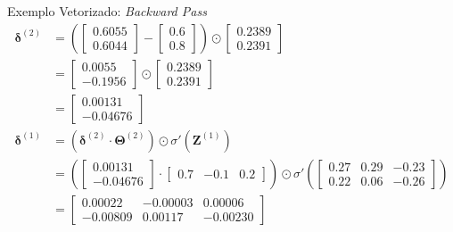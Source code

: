 \documentclass[aspectratio=169, xcolor=dvipsnames]{beamer}
\begin{document}
\begin{frame}{Exemplo Vetorizado: \textit{Backward Pass}}
        \small
        \begin{align*}
      \bm{\delta}^{(2)} &= \left(
      \begin{bmatrix}
        0.6055 \\
        0.6044
      \end{bmatrix}
      -
      \begin{bmatrix}
        0.6 \\
        0.8
      \end{bmatrix}
      \right) \odot
      \begin{bmatrix}
        0.2389 \\
        0.2391
      \end{bmatrix}\\
      &=
      \begin{bmatrix}
        0.0055  \\
        -0.1956
      \end{bmatrix}
      \odot
      \begin{bmatrix}
        0.2389 \\
        0.2391
      \end{bmatrix}\\
      &=
      \begin{bmatrix}
        0.00131 \\
        -0.04676
      \end{bmatrix}\\
      \bm{\delta}^{(1)} &= (\bm{\delta}^{(2)}\cdot \mathbf{\Theta}^{(2)}) \odot \sigma'(\mathbf{Z}^{(1)})\\
      &= \left(
      \begin{bmatrix}
        0.00131 \\
        -0.04676
      \end{bmatrix}
      \cdot
      \begin{bmatrix}
        0.7 & -0.1 & 0.2
      \end{bmatrix}
      \right) \odot \sigma'\left(\begin{bmatrix}
        0.27 & 0.29 & -0.23 \\
        0.22 & 0.06 & -0.26
      \end{bmatrix}\right)\\
      &=
      \begin{bmatrix}
        0.00022 & -0.00003 & 0.00006 \\
        -0.00809 & 0.00117 & -0.00230
      \end{bmatrix}
        \end{align*}                
\end{frame}
\end{document}
